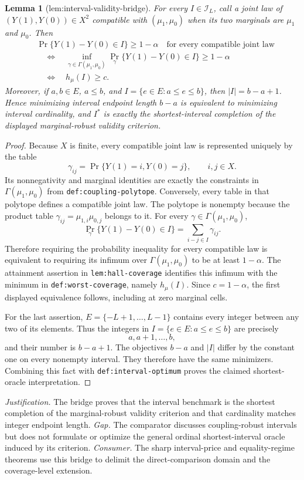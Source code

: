 \documentclass{article}
\newtheorem{lemma}{Lemma}
\begin{document}
\begin{lemma}[lem:interval-validity-bridge]\label{lem:interval-validity-bridge}
For every \(I\in\mathcal I_L\), call a joint law of \((Y(1),Y(0))\in X^2\) compatible with \((\mu_1,\mu_0)\) when its two marginals are \(\mu_1\) and \(\mu_0\).  Then
\[
\begin{split}
&\Pr\{Y(1)-Y(0)\in I\}\geq 1-\alpha
   \quad\text{for every compatible joint law}\\
&\quad\Longleftrightarrow\quad
\inf_{\gamma\in\Gamma(\mu_1,\mu_0)}
\Pr_{\gamma}\{Y(1)-Y(0)\in I\}\geq1-\alpha\\
&\quad\Longleftrightarrow\quad h_{\mu}(I)\geq c.
\end{split}
\]
Moreover, if \(a,b\in E\), \(a\leq b\), and \(I=\{e\in E:a\leq e\leq b\}\), then \(|I|=b-a+1\).  Hence minimizing interval endpoint length \(b-a\) is equivalent to minimizing interval cardinality, and \(I^*\) is exactly the shortest-interval completion of the displayed marginal-robust validity criterion.
\end{lemma}
\begin{proof}
Because \(X\) is finite, every compatible joint law is represented uniquely by the table
\[
\gamma_{ij}=\Pr\{Y(1)=i,Y(0)=j\},\qquad i,j\in X.
\]
Its nonnegativity and marginal identities are exactly the constraints in \(\Gamma(\mu_1,\mu_0)\) from \texttt{def:coupling-polytope}.  Conversely, every table in that polytope defines a compatible joint law.  The polytope is nonempty because the product table \(\gamma_{ij}=\mu_{1,i}\mu_{0,j}\) belongs to it.  For every \(\gamma\in\Gamma(\mu_1,\mu_0)\),
\[
\Pr_{\gamma}\{Y(1)-Y(0)\in I\}
=\sum_{i-j\in I}\gamma_{ij}.
\]
Therefore requiring the probability inequality for every compatible law is equivalent to requiring its infimum over \(\Gamma(\mu_1,\mu_0)\) to be at least \(1-\alpha\).  The attainment assertion in \texttt{lem:hall-coverage} identifies this infimum with the minimum in \texttt{def:worst-coverage}, namely \(h_{\mu}(I)\).  Since \(c=1-\alpha\), the first displayed equivalence follows, including at zero marginal cells.

For the last assertion, \(E=\{-L+1,\ldots,L-1\}\) contains every integer between any two of its elements.  Thus the integers in \(I=\{e\in E:a\leq e\leq b\}\) are precisely
\[
a,a+1,\ldots,b,
\]
and their number is \(b-a+1\).  The objectives \(b-a\) and \(|I|\) differ by the constant one on every nonempty interval.  They therefore have the same minimizers.  Combining this fact with \texttt{def:interval-optimum} proves the claimed shortest-oracle interpretation.
\end{proof}
\par\smallskip\noindent \textit{Justification.} The bridge proves that the interval benchmark is the shortest completion of the marginal-robust validity criterion and that cardinality matches integer endpoint length. \textit{Gap.} The comparator discusses coupling-robust intervals but does not formulate or optimize the general ordinal shortest-interval oracle induced by its criterion. \textit{Consumer.} The sharp interval-price and equality-regime theorems use this bridge to delimit the direct-comparison domain and the coverage-level extension.
\end{document}
